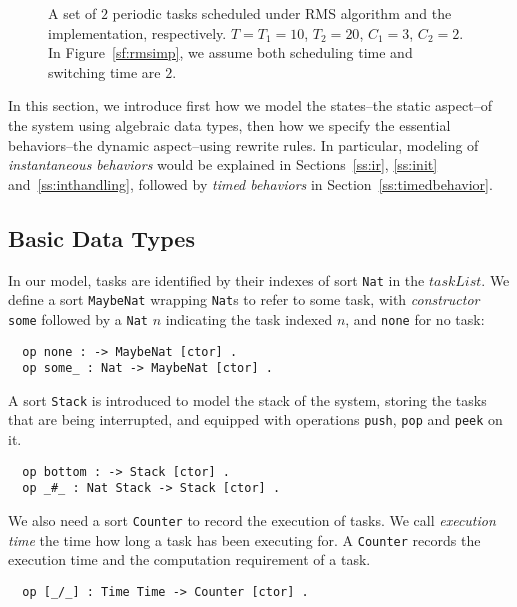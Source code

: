\documentclass[10pt,journal]{IEEEtran}
\begin{document}
\begin{figure}[!t]
{
\label{sf:rmsimp}}
\caption{A set of $2$ periodic tasks scheduled under RMS algorithm and
  the implementation, respectively. $T=T_1=10$, $T_2=20$, $C_1=3$,
  $C_2=2$. In Figure~\ref{sf:rmsimp}, we assume both scheduling time
  and switching time are $2$.}
\label{f:example}
\end{figure}

In this section, we introduce first how we model the states--the
static aspect--of the system using algebraic data types, then how we
specify the essential behaviors--the dynamic aspect--using rewrite
rules. In particular, modeling of \emph{instantaneous behaviors} would
be explained in Sections~\ref{ss:ir}, \ref{ss:init}
and~\ref{ss:inthandling}, followed by \emph{timed behaviors} in
Section~\ref{ss:timedbehavior}.

\subsection{Basic Data Types}
In our model, tasks are identified by their indexes of sort \verb|Nat|
in the $taskList$. We define a sort \verb|MaybeNat| wrapping
\verb|Nat|s to refer to some task, with \emph{constructor} \verb|some|
followed by a \verb|Nat| $n$ indicating the task indexed $n$, and
\verb|none| for no task:
\begin{verbatim}
  op none : -> MaybeNat [ctor] .
  op some_ : Nat -> MaybeNat [ctor] .
\end{verbatim}

A sort \verb|Stack| is introduced to model the stack of the system,
storing the tasks that are being interrupted, and equipped with
operations \verb|push|, \verb|pop| and \verb|peek| on it.
\begin{verbatim}
  op bottom : -> Stack [ctor] .
  op _#_ : Nat Stack -> Stack [ctor] .
\end{verbatim}

We also need
a sort \verb|Counter| to record the execution of tasks.  We call
\emph{execution time} the time how long a task has been executing
for. A \verb|Counter| records the execution time and the computation
requirement of a task.
\begin{verbatim}
  op [_/_] : Time Time -> Counter [ctor] .
\end{verbatim}
\end{document}

